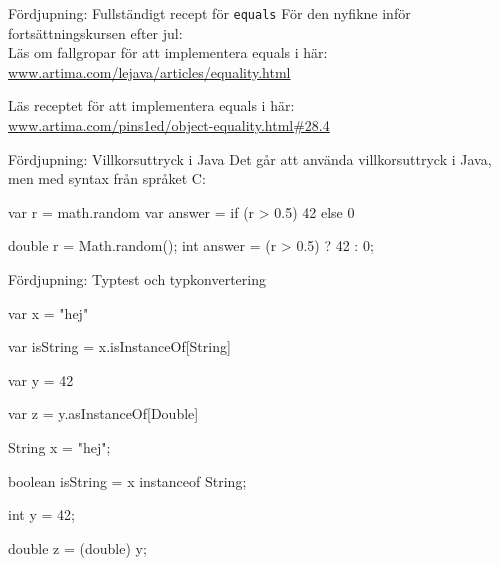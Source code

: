 \begin{Slide}{Fördjupning: Fullständigt recept för \texttt{equals}}
För den nyfikne inför fortsättningskursen efter jul: \\

\vspace{2em}
Läs om fallgropar för att implementera equals i  här: \\
\href{http://www.artima.com/lejava/articles/equality.html}{www.artima.com/lejava/articles/equality.html}


\vspace{2em}
Läs receptet för att implementera equals i  här: \\
\href{http://www.artima.com/pins1ed/object-equality.html#28.4}{www.artima.com/pins1ed/object-equality.html\#28.4}
\end{Slide}






\begin{Slide}{Fördjupning: Villkorsuttryck i Java}\SlideFontSmall
Det går att använda villkorsuttryck i Java, men med syntax från språket C:
\begin{multicols}{2}
\begin{CodeSmall}[basicstyle=\ttfamily\SlideFontSize{6}{8}]
var r = math.random
var answer = if (r > 0.5) 42 else 0
\end{CodeSmall}

\columnbreak

\begin{CodeSmall}[language=Java,basicstyle=\ttfamily\SlideFontSize{6}{8}]
double r = Math.random();
int answer = (r > 0.5) ? 42 : 0;
\end{CodeSmall}
\end{multicols}

\end{Slide}




\begin{Slide}{Fördjupning: Typtest och typkonvertering}

\begin{multicols}{2}
\begin{CodeSmall}[basicstyle=\ttfamily\SlideFontSize{6}{8}]
var x = "hej"

var isString = x.isInstanceOf[String]

var y = 42

var z = y.asInstanceOf[Double]

\end{CodeSmall}

\columnbreak

\begin{CodeSmall}[language=Java,basicstyle=\ttfamily\SlideFontSize{6}{8}]
String x = "hej";

boolean isString = x instanceof String;

int y = 42;

double z = (double) y;
\end{CodeSmall}
\end{multicols}


\end{Slide}


